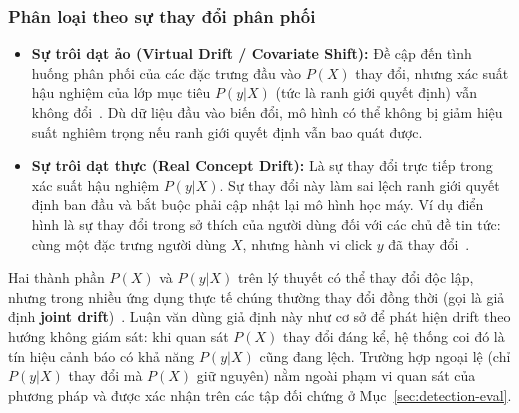\subsubsection{Phân loại theo sự thay đổi phân phối}
\label{sec:drift-pxpyx}
\begin{itemize}
    \item \textbf{Sự trôi dạt ảo (Virtual Drift / Covariate Shift):} Đề cập đến tình huống phân phối của các đặc trưng đầu vào $P(X)$ thay đổi, nhưng xác suất hậu nghiệm của lớp mục tiêu $P(y|X)$ (tức là ranh giới quyết định) vẫn không đổi~\cite{moreno2012unifying}. Dù dữ liệu đầu vào biến đổi, mô hình có thể không bị giảm hiệu suất nghiêm trọng nếu ranh giới quyết định vẫn bao quát được.
    
    \item \textbf{Sự trôi dạt thực (Real Concept Drift):} Là sự thay đổi trực tiếp trong xác suất hậu nghiệm $P(y|X)$. Sự thay đổi này làm sai lệch ranh giới quyết định ban đầu và bắt buộc phải cập nhật lại mô hình học máy. Ví dụ điển hình là sự thay đổi trong sở thích của người dùng đối với các chủ đề tin tức: cùng một đặc trưng người dùng $X$, nhưng hành vi click $y$ đã thay đổi~\cite{gama2014survey}.
\end{itemize}

Hai thành phần $P(X)$ và $P(y|X)$ trên lý thuyết có thể thay đổi độc lập, nhưng trong nhiều ứng dụng thực tế chúng thường thay đổi đồng thời (gọi là giả định \textbf{joint drift})~\cite{lu2018learning}. Luận văn dùng giả định này như cơ sở để phát hiện drift theo hướng không giám sát: khi quan sát $P(X)$ thay đổi đáng kể, hệ thống coi đó là tín hiệu cảnh báo có khả năng $P(y|X)$ cũng đang lệch. Trường hợp ngoại lệ (chỉ $P(y|X)$ thay đổi mà $P(X)$ giữ nguyên) nằm ngoài phạm vi quan sát của phương pháp và được xác nhận trên các tập đối chứng ở Mục~\ref{sec:detection-eval}.

